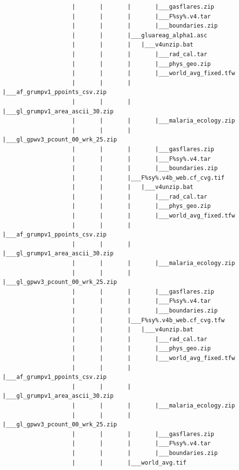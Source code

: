 \documentclass[]{book}
\begin{document}
\begin{verbatim}
                    |       |       |       |___gasflares.zip
                    |       |       |       |___F%sy%.v4.tar
                    |       |       |       |___boundaries.zip
                    |       |       |___gluareag_alpha1.asc
                    |       |       |   |___v4unzip.bat
                    |       |       |       |___rad_cal.tar
                    |       |       |       |___phys_geo.zip
                    |       |       |       |___world_avg_fixed.tfw
                    |       |       |       |___af_grumpv1_ppoints_csv.zip
                    |       |       |       |___gl_grumpv1_area_ascii_30.zip
                    |       |       |       |___malaria_ecology.zip
                    |       |       |       |___gl_gpwv3_pcount_00_wrk_25.zip
                    |       |       |       |___gasflares.zip
                    |       |       |       |___F%sy%.v4.tar
                    |       |       |       |___boundaries.zip
                    |       |       |___F%sy%.v4b_web.cf_cvg.tif
                    |       |       |   |___v4unzip.bat
                    |       |       |       |___rad_cal.tar
                    |       |       |       |___phys_geo.zip
                    |       |       |       |___world_avg_fixed.tfw
                    |       |       |       |___af_grumpv1_ppoints_csv.zip
                    |       |       |       |___gl_grumpv1_area_ascii_30.zip
                    |       |       |       |___malaria_ecology.zip
                    |       |       |       |___gl_gpwv3_pcount_00_wrk_25.zip
                    |       |       |       |___gasflares.zip
                    |       |       |       |___F%sy%.v4.tar
                    |       |       |       |___boundaries.zip
                    |       |       |___F%sy%.v4b_web.cf_cvg.tfw
                    |       |       |   |___v4unzip.bat
                    |       |       |       |___rad_cal.tar
                    |       |       |       |___phys_geo.zip
                    |       |       |       |___world_avg_fixed.tfw
                    |       |       |       |___af_grumpv1_ppoints_csv.zip
                    |       |       |       |___gl_grumpv1_area_ascii_30.zip
                    |       |       |       |___malaria_ecology.zip
                    |       |       |       |___gl_gpwv3_pcount_00_wrk_25.zip
                    |       |       |       |___gasflares.zip
                    |       |       |       |___F%sy%.v4.tar
                    |       |       |       |___boundaries.zip
                    |       |       |___world_avg.tif

\end{verbatim}
\end{document}
